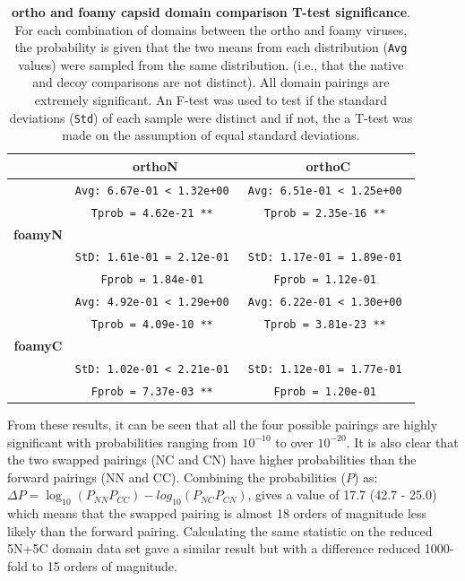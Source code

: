 \documentclass{bmcart}
\begin{document}
\begin{table}
\centering
\begin{tabular}{c|c|c|}
             &          {\bf orthoN}           &          {\bf orthoC}           \\
\hline \hline
             & {\tt Avg: 6.67e-01 < 1.32e+00 } & {\tt Avg: 6.51e-01 < 1.25e+00 } \\
             & {\tt Tprob = 4.62e-21 **      } & {\tt Tprob = 2.35e-16 **      } \\
{\bf foamyN} &                                 &                                 \\
             & {\tt StD: 1.61e-01 = 2.12e-01 } & {\tt StD: 1.17e-01 = 1.89e-01 } \\
             & {\tt Fprob = 1.84e-01         } & {\tt Fprob = 1.12e-01         } \\
\hline
             & {\tt Avg: 4.92e-01 < 1.29e+00 } & {\tt Avg: 6.22e-01 < 1.30e+00 } \\
             & {\tt Tprob = 4.09e-10 **      } & {\tt Tprob = 3.81e-23 **      } \\
{\bf foamyC} &                                 &                                 \\
             & {\tt StD: 1.02e-01 < 2.21e-01 } & {\tt StD: 1.12e-01 = 1.77e-01 } \\
             & {\tt Fprob = 7.37e-03 **      } & {\tt Fprob = 1.20e-01         } \\
\hline \hline
\end{tabular}
\begin{footnotesize}
\caption{
\label{Tab:Ttest}
{\bf ortho and foamy capsid domain comparison T-test significance}.
For each combination of domains between the ortho and foamy viruses, the probability
is given that the two means from each distribution ({\tt Avg} values) were sampled
from the same distribution.  (i.e., that the native and decoy comparisons are
not distinct).   All domain pairings are extremely significant.   An F-test was used to
test if the standard deviations ({\tt Std}) of each sample were distinct and if not,
the a T-test was made on the assumption of equal standard deviations.
}
\end{footnotesize}
\end{table}

From these results, it can be seen that all the four possible pairings are
highly significant with probabilities ranging from $10^{-10}$ to over $10^{-20}$.
It is also clear that the two swapped pairings (NC and CN) have higher probabilities
than the forward pairings (NN and CC).   Combining the probabilities ($P$) as:
$\Delta P = \log_{10}(P_{NN} P_{CC}) - log_{10}(P_{NC} P_{CN})$,
gives a value of 17.7 (42.7 - 25.0) which means that the swapped pairing is almost 18
orders of magnitude less likely than the forward pairing.
Calculating the same statistic on the reduced 5N+5C domain data set gave a similar result
but with a difference reduced 1000-fold to 15 orders of magnitude.
\end{document}

